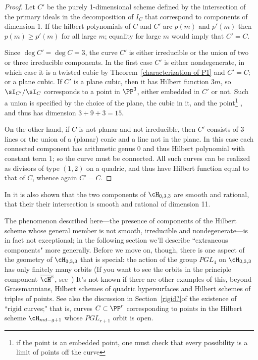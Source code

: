 \begin{proof}
Let $C'$ be the purely 1-dimensional scheme defined by the intersection of the primary ideals in the decomposition of $I_C$ that correspond to
components of dimension 1. If the hilbert polynomials of $C$ and $C'$ are $p(m)$ and  $p'(m)$ then
$p(m) \geq p'(m)$ for all large $m$; equality for large $m$ would imply that $C'=C$.

Since $\deg C' = \deg C = 3$, the curve $C'$ is either irreducible or the union of two or three irreducible components. In the first case $C'$ is either nondegenerate, in which case it is a twisted cubic by Theorem~\ref{characterization of P1} and $C' = C$; or a plane cubic. If $C'$ is a plane cubic, then it has Hilbert function $3m$, so $\sI_{C'}/\sI_C$
corresponds to a point in $\PP^3$, either embedded in $C'$ or not. Such a union is specified by the choice of the
plane, the cubic in it, and the point\footnote{if the point is an embedded point, one must check that every possibility
is a limit of points off the curve} , and thus has dimension $3 + 9+3 = 15.$

On the other hand, if $C$ is not planar and not irreducible, then $C'$ consists of 3 lines or the union of a (planar) conic
and a line not in the plane. In this case each connected component has arithmetic genus 0 and thus Hilbert polynomial
with constant term 1; so the curve must be connected. All such curves can be realized as divisors of type $(1,2)$
on a quadric, and thus have Hilbert function equal to that of $C$, whence again $C' = C$.
\end{proof}



\begin{fact}
In \cite{Piene-Schlessinger} it is also shown that the two components of $\cH_{0,3,3}$ are smooth and rational, that
their their intersection is  smooth and rational of dimension 11.
\end{fact}

The phenomenon described here---the presence of components of the Hilbert scheme whose general member is not smooth, irreducible and nondegenerate---is in fact not exceptional; in the following section we'll describe ``extraneous components" more generally. Before we move on, though, there is one aspect of the geometry of $\cH_{0,3,3}$ that is special: the action of the group $PGL_4$ on $\cH_{0,3,3}$ has only finitely many orbits (If you want to see the orbits in the principle component $\overline{\cH^\circ}$, see~\cite{Montreal}) It's not known if there are other examples of this, beyond Grassmannians, Hilbert schemes of quadric hypersurfaces and Hilbert schemes of triples of points. See also the discussion in Section~\ref{rigid?}of the existence of ``rigid curves;" that is, curves $C \subset \PP^r$ corresponding to points in the Hilbert scheme $\cH_{md-g+1}$ whose $PGL_{r+1}$ orbit is open.

